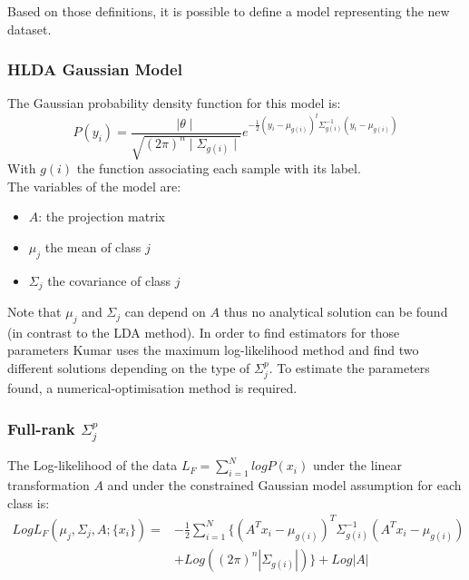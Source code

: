 Based on those definitions, it is possible to define a model representing the new dataset.

\subsubsection{HLDA Gaussian Model}

The Gaussian probability density function for this model is:
$$P(y_i) = \frac{\mid \theta \mid}{\sqrt{(2\pi)^n \mid \Sigma_{g(i)} \mid}}
e^{-\frac{1}{2} (y_i - \mu_{g(i)})^t \Sigma_{g(i)}^{-1} (y_i - \mu_{g(i)})}$$
With $g(i)$ the function associating each sample with its label.\\
The variables of the model are:
\begin{itemize}
  \item $A$: the projection matrix
  \item $\mu_j$ the mean of class $j$
  \item $\Sigma_j$ the covariance of class $j$
\end{itemize}

Note that $\mu_j$ and $\Sigma_j$ can depend on $A$ thus no analytical solution can be found (in contrast to the LDA method). In order to find estimators for those parameters Kumar\cite{kumar.1997} uses the maximum log-likelihood method and find two different solutions depending on the type of $\Sigma_j^p$.
To estimate the parameters found, a numerical-optimisation method is required.

\subsubsection{Full-rank $\Sigma_j^p$}

The Log-likelihood of the data $L_F = \sum\limits_{i = 1}^N log P(x_i)$ under the linear transformation $A$ and under the constrained Gaussian model assumption for each class is:
$$\begin{array}{cl}
  Log L_F(\mu_j, \Sigma_j, A; \{x_i\}) = & - \frac{1}{2} \sum\limits_{i = 1}^N\{(A^T x_i - \mu_{g(i)})^T\Sigma_{g(i)}^{-1}
  (A^T x_i - \mu_{g(i)}) \\
  & + Log((2\pi)^n|\Sigma_{g(i)}|)\} + Log|A|
\end{array}$$

